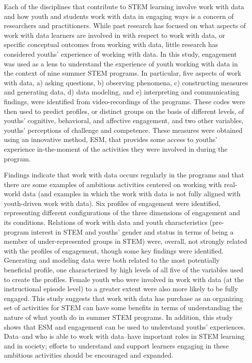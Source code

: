 \documentclass[]{book}
\theoremstyle{definition}
\theoremstyle{definition}
\theoremstyle{definition}
\theoremstyle{remark}
\begin{document}
Each of the disciplines that contribute to STEM learning involve work
with data and how youth and students work with data in engaging ways is
a concern of researchers and practitioners. While past research has
focused on what aspects of work with data learners are involved in with
respect to work with data, or specific conceptual outcomes from working
with data, little research has considered youths' experience of working
with data. In this study, engagement was used as a lens to understand
the experience of youth working with data in the context of nine summer
STEM programs. In particular, five aspects of work with data, a) asking
questions, b) observing phenomena, c) constructing measures and
generating data, d) data modeling, and e) interpreting and communicating
findings, were identified from video-recordings of the programs. These
codes were then used to predict profiles, or distinct groups on the
basis of different levels, of youths' cognitive, behavioral, and
affective engagement, and two other variables, youths' perceptions of
challenge and competence. These measures were obtained using an
innovative method, ESM, that provides some access to youths' experience
in-the-moment of the activities they were involved in during the
program.

Findings indicate that work with data occurs regularly in the programs
and that there are some examples of ambitious activities centered on
working with real-world data (and examples in which the work with data
is not fully aligned with youth-driven work with data). Six profiles of
engagement were identified, representing different configurations of the
three dimensions of engagement and its conditions. Relations of work
with data and youth characteristics (pre-program interest in STEM and
youths' gender and status in terms of being a member of
under-represented groups in STEM) were, overall, not strongly related
with the profiles of engagement, though some key findings were
identified. Generating and modeling data were both related to the most
potentially beneficial profile, one characterized by high levels of all
five of the variables used to create the profiles. Female youth who were
involved in work with data (at the instructional episode level) to a
greater extent were also more likely to be fully engaged. This study
suggests that work with data has purchase as an organizing set of
activities for STEM can have some benefits in terms of understanding the
nature of what youth do in summer STEM programs. In addition, this study
shows that ESM and engagement can be used to understand youths'
experiences. Data--and who is able to work with data--have important
roles in STEM learning and in society; efforts to understand and support
learners engaging in these ambitious activities should be encouraged and
expanded.
\end{document}
